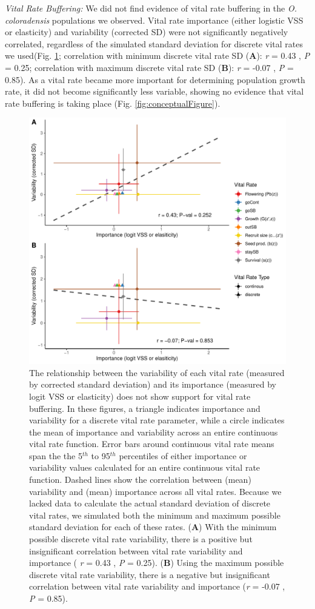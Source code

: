 \documentclass[12pt, letterpaper]{article}
\begin{document}
\textit{Vital Rate Buffering:} We did not find evidence of vital rate buffering in the \textit{O. coloradensis} populations we observed. Vital rate importance (either logistic VSS or elasticity) and variability (corrected SD) were not significantly negatively correlated, regardless of the simulated standard deviation for discrete vital rates we used(Fig. \ref{fig:VRBuffering}; correlation with minimum discrete vital rate SD (\textbf{A}): \textit{r} = 0.43 , \textit{P} = 0.25; correlation with maximum discrete vital rate SD (\textbf{B}): \textit{r} = -0.07 , \textit{P} = 0.85). As a vital rate became more important for determining population growth rate, it did not become significantly less variable, showing no evidence that vital rate buffering is taking place (Fig. \ref{fig:conceptualFigure}).  

\begin{figure}[h]
  \centering
  \includegraphics[width=.7\textwidth]{figures/VRbufferingFigure.pdf}
  \caption{The relationship between the variability of each vital rate (measured by corrected standard deviation) and its importance (measured by logit VSS or elasticity) does not show support for vital rate buffering. In these figures, a triangle indicates importance and variability for a discrete vital rate parameter, while a circle indicates the mean of importance and variability across an entire continuous vital rate function. Error bars around continuous vital rate means span the the 5$^{th}$ to 95$^{th}$ percentiles of either importance or variability values calculated for an entire continuous vital rate function. Dashed lines show the correlation between (mean) variability and (mean) importance across all vital rates. Because we lacked data to calculate the actual standard deviation of discrete vital rates, we simulated both the minimum and maximum possible standard deviation for each of these rates. (\textbf{A}) With the minimum possible discrete vital rate variability, there is a positive but insignificant correlation between vital rate variability and importance ( \textit{r} = 0.43 , \textit{P} = 0.25). (\textbf{B}) Using the maximum possible discrete vital rate variability, there is a negative but insignificant correlation between vital rate variability and importance (\textit{r} = -0.07 , \textit{P} = 0.85).}
  \label{fig:VRBuffering}
\end{figure} 
\end{document}

